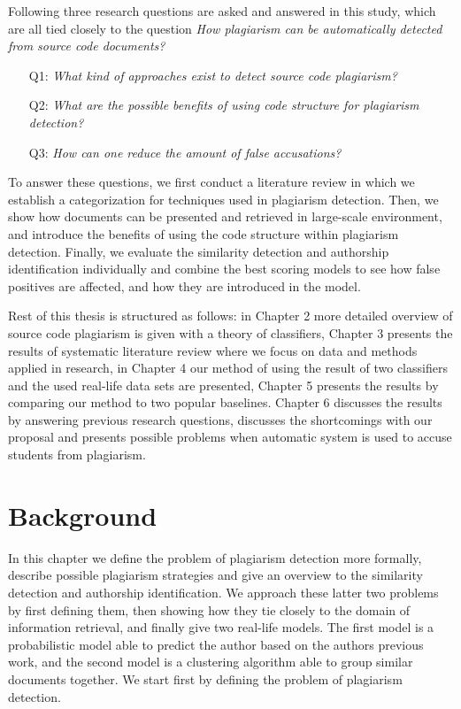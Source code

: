 \documentclass[english, grading]{tktltiki2}
\theoremstyle{definition}
\theoremstyle{remark}
\numberwithin{equation}{section} %
\begin{document}
Following three research questions are asked and answered in this study, which are all tied closely to the question \emph{How plagiarism can be automatically detected from source code documents?}

\begin{itemize}
    \item[Q1:] \emph{What kind of approaches exist to detect source code plagiarism?}
    \item[Q2:] \emph{What are the possible benefits of using code structure for plagiarism detection?}
    \item[Q3:] \emph{How can one reduce the amount of false accusations?}
\end{itemize}

\noindent
To answer these questions, we first conduct a literature review in which we  establish a categorization for techniques used in plagiarism detection. Then, we show how documents can be presented and retrieved in large-scale environment, and introduce the benefits of using the code structure within plagiarism detection. Finally, we evaluate the similarity detection and authorship identification individually and combine the best scoring models to see how false positives are affected, and how they are introduced in the model. 

Rest of this thesis is structured as follows: in Chapter 2 more detailed overview of source code plagiarism is given with a theory of classifiers, Chapter 3 presents the results of systematic literature review where we focus on data and methods applied in research, in Chapter 4 our method of using the result of two classifiers and the used real-life data sets are presented, Chapter 5 presents the results by comparing our method to two popular baselines. Chapter 6 discusses the results by answering previous research questions, discusses the shortcomings with our proposal and presents possible problems when automatic system is used to accuse students from plagiarism. 

\section{Background}

In this chapter we define the problem of plagiarism detection more formally, describe possible plagiarism strategies and give an overview to the similarity detection and authorship identification. We approach these latter two problems by first defining them, then showing how they tie closely to the domain of information retrieval, and finally give two real-life models. The first model is a probabilistic model able to predict the author based on the authors previous work, and the second model is a clustering algorithm able to group similar documents together. We start first by defining the problem of plagiarism detection.    
\end{document}
